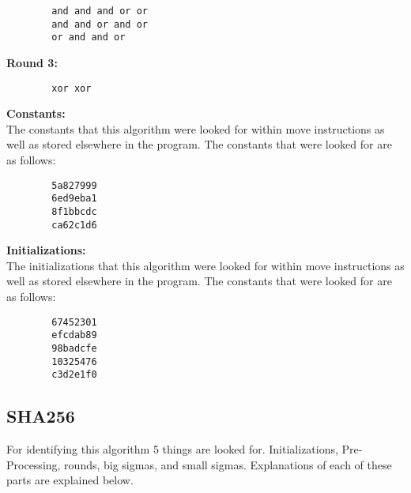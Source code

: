 \documentclass{article}
\begin{document}
\begin{algorithm}
\lstset{language=[mips]Assembler}
\begin{lstlisting}
        and and and or or
        and and or and or
        or and and or
\end{lstlisting}
\end{algorithm}
\pagebreak
    \textbf{Round 3:}\\

\begin{algorithm}
\lstset{language=[mips]Assembler}
\begin{lstlisting}
        xor xor
\end{lstlisting}
\end{algorithm}

    \textbf{Constants:}\\

    The constants that this algorithm were looked for within move instructions
    as well as stored elsewhere in the program. The constants that were looked
    for are as follows:\\

\begin{algorithm}
\lstset{language=[mips]Assembler}
\begin{lstlisting}
        5a827999
        6ed9eba1
        8f1bbcdc
        ca62c1d6
\end{lstlisting}
\end{algorithm}

    \textbf{Initializations:}\\

    The initializations that this algorithm were looked for within move instructions
    as well as stored elsewhere in the program. The constants that were looked
    for are as follows:\\

\begin{algorithm}
\lstset{language=[mips]Assembler}
\begin{lstlisting}
        67452301
        efcdab89
        98badcfe
        10325476
        c3d2e1f0
\end{lstlisting}
\end{algorithm}

\subsection*{SHA256}
For identifying this algorithm 5 things are looked for. Initializations, 
Pre-Processing, rounds, big sigmas, and small sigmas. Explanations of each of
these parts are explained below.\\
\end{document}
